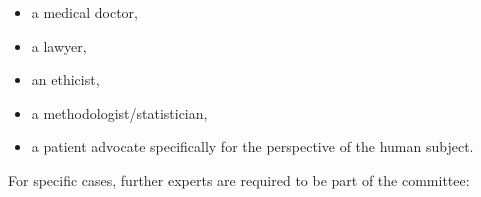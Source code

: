 \documentclass[authordate, meta, issue]{jote-new-article}
\begin{document}
\begin{itemize}
  \item a medical doctor,



  \item a lawyer,



  \item an ethicist,



  \item a methodologist/statistician,



  \item a patient advocate specifically for the perspective of the human subject.


\end{itemize}

For specific cases, further experts are required to be part of the committee:
\end{document}

